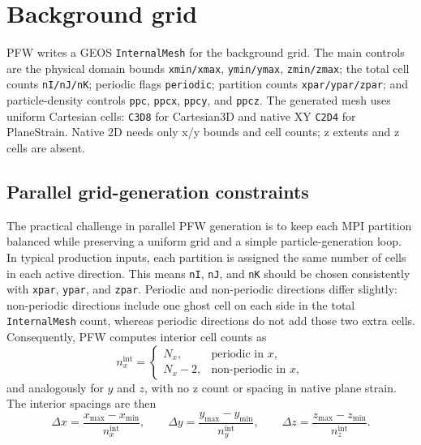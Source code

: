 \section{Background grid}
\label{sec:pfw-background-grid}

PFW writes a GEOS \texttt{InternalMesh} for the background grid.  The main controls are the physical domain bounds \texttt{xmin/xmax}, \texttt{ymin/ymax}, \texttt{zmin/zmax}; the total cell counts \texttt{nI/nJ/nK}; periodic flags \texttt{periodic}; partition counts \texttt{xpar/ypar/zpar}; and particle-density controls \texttt{ppc}, \texttt{ppcx}, \texttt{ppcy}, and \texttt{ppcz}.  The generated mesh uses uniform Cartesian cells: \texttt{C3D8} for Cartesian3D and native XY \texttt{C2D4} for PlaneStrain. Native 2D needs only x/y bounds and cell counts; z extents and z cells are absent.

\subsection{Parallel grid-generation constraints}

The practical challenge in parallel PFW generation is to keep each MPI partition balanced while preserving a uniform grid and a simple particle-generation loop.  In typical production inputs, each partition is assigned the same number of cells in each active direction.  This means \texttt{nI}, \texttt{nJ}, and \texttt{nK} should be chosen consistently with \texttt{xpar}, \texttt{ypar}, and \texttt{zpar}.  Periodic and non-periodic directions differ slightly: non-periodic directions include one ghost cell on each side in the total \texttt{InternalMesh} count, whereas periodic directions do not add those two extra cells.  Consequently, PFW computes interior cell counts as
\begin{equation}
  n_x^{\mathrm{int}} =
  \begin{cases}
  N_x, & \text{periodic in }x,\\
  N_x-2, & \text{non-periodic in }x,
  \end{cases}
\end{equation}
and analogously for \(y\) and \(z\), with no z count or spacing in native plane strain.  The interior spacings are then
\begin{equation}
  \Delta x = \frac{x_{\max}-x_{\min}}{n_x^{\mathrm{int}}}, \qquad
  \Delta y = \frac{y_{\max}-y_{\min}}{n_y^{\mathrm{int}}}, \qquad
  \Delta z = \frac{z_{\max}-z_{\min}}{n_z^{\mathrm{int}}}.
\end{equation}

